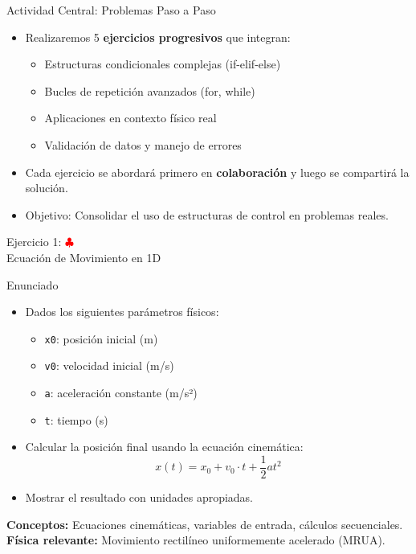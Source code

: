 \documentclass[10pt]{beamer}
\begin{document}
\begin{frame}{Actividad Central: Problemas Paso a Paso}
  \begin{itemize}
    \item Realizaremos 5 \textbf{ejercicios progresivos} que integran:
      \begin{itemize}
        \item Estructuras condicionales complejas (if-elif-else)
        \item Bucles de repetición avanzados (for, while)
        \item Aplicaciones en contexto físico real
        \item Validación de datos y manejo de errores
      \end{itemize}
    \item Cada ejercicio se abordará primero en \textbf{colaboración} y luego se compartirá la solución.
    \item Objetivo: Consolidar el uso de estructuras de control en problemas reales.
  \end{itemize}
\end{frame}

\begin{frame}{Ejercicio 1: \hfill \textcolor{red}{$\clubsuit$} \\ Ecuación de Movimiento en 1D}
  \begin{block}{Enunciado}
    \begin{itemize}
      \item Dados los siguientes parámetros físicos:
        \begin{itemize}
          \item \texttt{x0}: posición inicial (m)
          \item \texttt{v0}: velocidad inicial (m/s)
          \item \texttt{a}: aceleración constante (m/s²)
          \item \texttt{t}: tiempo (s)
        \end{itemize}
      \item Calcular la posición final usando la ecuación cinemática:
        \[
          x(t) = x_0 + v_0 \cdot t + \frac{1}{2} a t^2
        \]
      \item Mostrar el resultado con unidades apropiadas.
    \end{itemize}
  \end{block}
  
  \textbf{Conceptos:} Ecuaciones cinemáticas, variables de entrada, cálculos secuenciales.
  \\
  \textbf{Física relevante:} Movimiento rectilíneo uniformemente acelerado (MRUA).
\end{frame}
\end{document}
